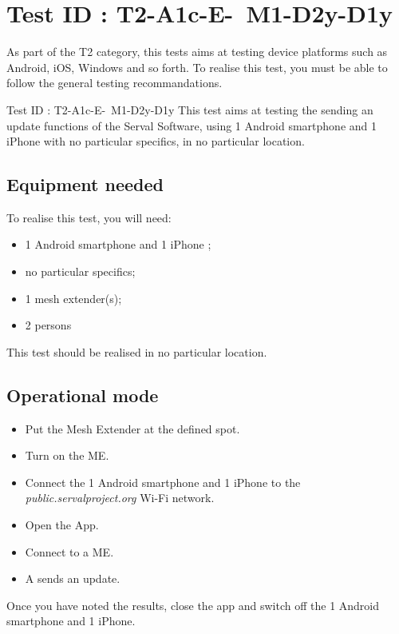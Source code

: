 \documentclass[oneside]{book}
\begin{document}
\section{Test ID : T2-A1c-E- M1-D2y-D1y}
\begin{itshape}
As part of the T2 category, this tests aims at testing device platforms such as Android, iOS, Windows and so forth.
To realise this test, you must be able to follow the general testing recommandations.
\end{itshape}
\newline
Test ID : T2-A1c-E- M1-D2y-D1y
 This test aims at testing the sending an update functions of the Serval Software, using 1 Android smartphone and 1 iPhone with no particular specifics, in no particular location.
\subsection{Equipment needed} To realise this test, you will need:
\begin{itemize}
\item 1 Android smartphone and 1 iPhone ;
\item no particular specifics;
\item 1 mesh extender(s);
\item 2 persons
\end{itemize}
This test should be realised in no particular location.
\subsection{Operational mode} \begin{itemize}
\item Put the Mesh Extender at the defined spot.
\item Turn on the ME.
\item Connect the 1 Android smartphone and 1 iPhone to the \emph{public.servalproject.org} Wi-Fi network.
\item Open the App.
\item Connect to a ME.
\item A sends an update.
\end{itemize}
Once you have noted the results, close the app and switch off the 1 Android smartphone and 1 iPhone.
\end{document}

